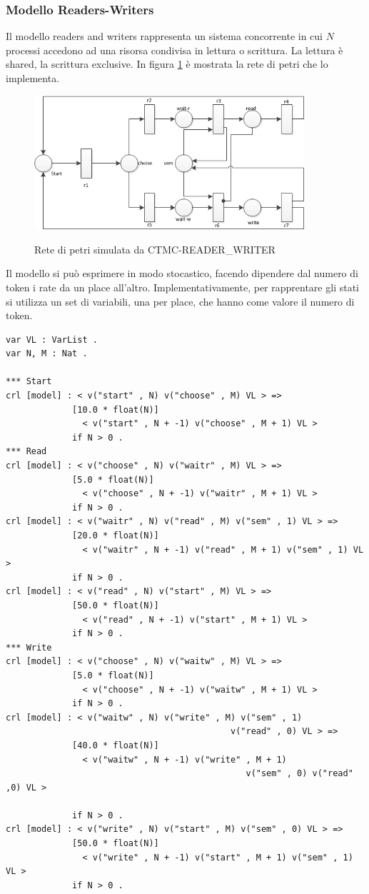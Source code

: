 \subsubsection{Modello Readers-Writers}
\label{sec:rw}
Il modello readers and writers rappresenta un sistema concorrente in cui $N$
processi accedono ad una risorsa condivisa in lettura o scrittura. La lettura è
shared, la scrittura exclusive.  In figura \ref{petri2} è  mostrata la rete di
petri che lo implementa.

\begin{figure}[!hb]
	\includegraphics[width=10cm]{../resources/images/petri2.png}
	\label{petri2}
	\caption{Rete di petri simulata da CTMC-READER\_WRITER}
\end{figure}

Il modello si può esprimere in modo stocastico, facendo dipendere dal numero di
token i rate da un place all'altro. Implementativamente, per rapprentare gli
stati si utilizza un set di variabili, una per place, che hanno come valore il
numero di token.
\begin{Verbatim}[fontsize=\small]
var VL : VarList .
var N, M : Nat .

*** Start
crl [model] : < v("start" , N) v("choose" , M) VL > =>
             [10.0 * float(N)]
               < v("start" , N + -1) v("choose" , M + 1) VL >
             if N > 0 .
*** Read
crl [model] : < v("choose" , N) v("waitr" , M) VL > =>
             [5.0 * float(N)]
               < v("choose" , N + -1) v("waitr" , M + 1) VL >
             if N > 0 .
crl [model] : < v("waitr" , N) v("read" , M) v("sem" , 1) VL > =>
             [20.0 * float(N)]
               < v("waitr" , N + -1) v("read" , M + 1) v("sem" , 1) VL >
             if N > 0 .
crl [model] : < v("read" , N) v("start" , M) VL > =>
             [50.0 * float(N)]
               < v("read" , N + -1) v("start" , M + 1) VL >
             if N > 0 .
*** Write
crl [model] : < v("choose" , N) v("waitw" , M) VL > =>
             [5.0 * float(N)]
               < v("choose" , N + -1) v("waitw" , M + 1) VL >
             if N > 0 .
crl [model] : < v("waitw" , N) v("write" , M) v("sem" , 1)
                                            v("read" , 0) VL > =>
             [40.0 * float(N)]
               < v("waitw" , N + -1) v("write" , M + 1)
                                               v("sem" , 0) v("read" ,0) VL >
             
             if N > 0 .
crl [model] : < v("write" , N) v("start" , M) v("sem" , 0) VL > =>
             [50.0 * float(N)]
               < v("write" , N + -1) v("start" , M + 1) v("sem" , 1) VL >
             if N > 0 .

\end{Verbatim}

